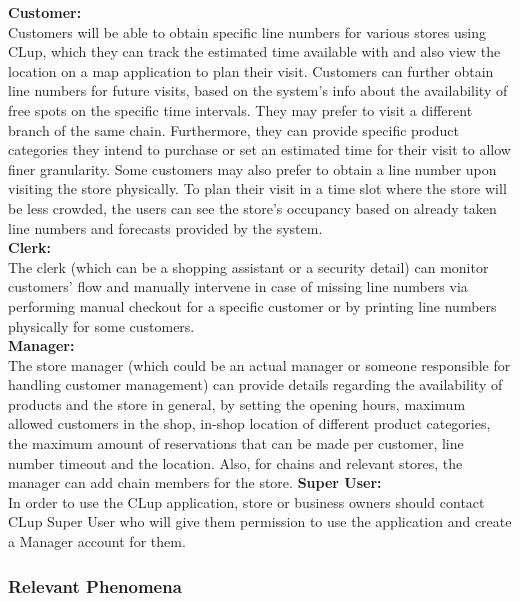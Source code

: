 \textbf{Customer:} \\
Customers will be able to obtain specific line numbers for various stores using CLup, which they can track the estimated time available with and also view the location on a map application to plan their visit.
Customers can further obtain line numbers for future visits, based on the system's info about the availability of free spots on the specific time intervals.
They may prefer to visit a different branch of the same chain.
Furthermore, they can provide specific product categories they intend to purchase or set an estimated time for their visit to allow finer granularity.
Some customers may also prefer to obtain a line number upon visiting the store physically.
To plan their visit in a time slot where the store will be less crowded, the users can see the store's occupancy based on already taken line numbers and forecasts provided by the system.
\\[0.5cm]
\textbf{Clerk:} \\
The clerk (which can be a shopping assistant or a security detail) can monitor customers' flow and manually intervene in case of missing line numbers via performing manual checkout for a specific customer or by printing line numbers physically for some customers.
\\[0.5cm]
\textbf{Manager:} \\
The store manager (which could be an actual manager or someone responsible for handling customer management) can provide details regarding the availability of products and the store in general, by setting the opening hours, maximum allowed customers in the shop, in-shop location of different product categories, the maximum amount of reservations that can be made per customer, line number timeout and the location.
Also, for chains and relevant stores, the manager can add chain members for the store.
\textbf{Super User:} \\
In order to use the CLup application, store or business owners should contact CLup Super User who will give them permission to use the application and create a Manager account for them.

\subsubsection{Relevant Phenomena}

